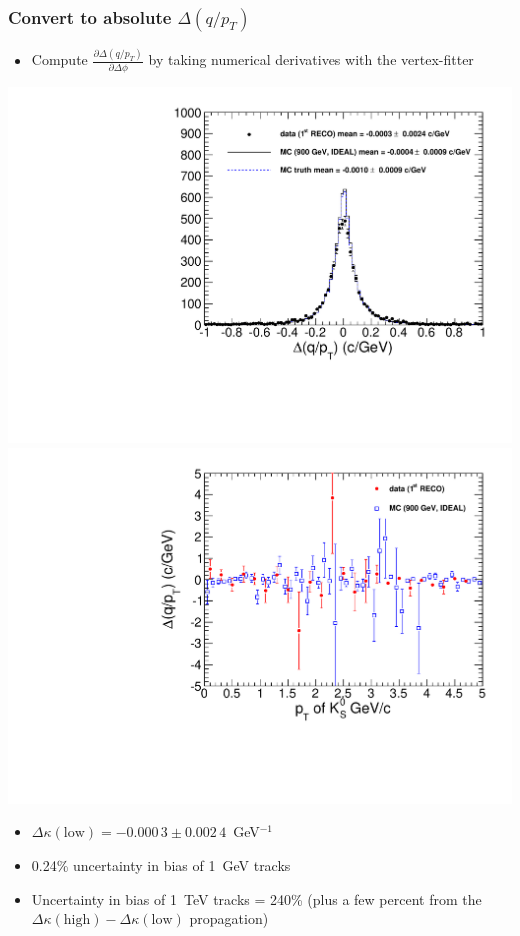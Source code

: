 \documentclass[compress]{beamer}
\begin{document}
\begin{frame}
\frametitle{Convert to absolute $\Delta(q/p_T)$}

\begin{itemize}
\item Compute $\frac{\partial \Delta(q/p_T)}{\partial \Delta \phi}$ by taking numerical derivatives with the vertex-fitter
\end{itemize}

\vfill
\includegraphics[width=0.5\linewidth]{kaonTracking2_deltaqoverpt.pdf}
\includegraphics[width=0.5\linewidth]{kaonTracking2_deltaqoverpt_vspt.pdf}

\vfill
\begin{itemize}
\item $\Delta \kappa(\mbox{low}) = -0.000\,3 \pm 0.002\,4$~GeV$^{-1}$
\item 0.24\% uncertainty in bias of 1~GeV tracks
\item Uncertainty in bias of 1~TeV tracks = 240\% (plus a few percent from the $\Delta \kappa(\mbox{high}) - \Delta \kappa(\mbox{low})$ propagation)
\end{itemize}
\end{frame}
\end{document}
